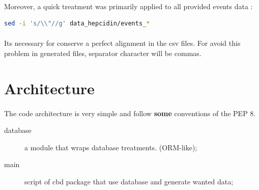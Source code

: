 \documentclass{report} %
\begin{document}
    \paragraph*{}
    Moreover, a quick treatment was primarily applied to all provided events data :
\begin{lstlisting}[language=bash]
sed -i 's/\\"//g' data_hepcidin/events_*
\end{lstlisting}
    \paragraph*{}
    Its necessary for conserve a perfect alignment in the csv files.
    For avoid this problem in generated files, separator character will be commas.



\newpage
\section{Architecture}
        \paragraph*{}
        The code architecture is very simple and follow \textbf{some} conventions of the PEP 8.
        \begin{description}
                \item[database] a module that wraps database treatments. (ORM-like);
                \item[main] script of cbd package that use database and generate wanted data;
        \end{description}
\end{document}
